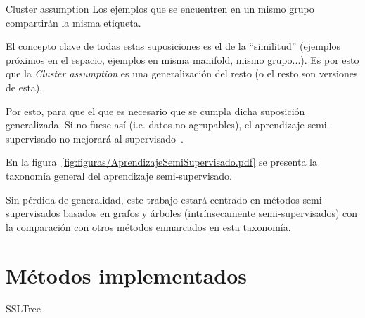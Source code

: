 \medskip

\begin{mainbox}{Cluster assumption}
    Los ejemplos que se encuentren en un mismo grupo compartirán la misma etiqueta.
\end{mainbox}


El concepto clave de todas estas suposiciones es el de la ``similitud'' 
(ejemplos próximos en el espacio, ejemplos en misma manifold, mismo grupo...). 
Es por esto que la \textit{Cluster assumption} es una generalización del
resto (o el resto son versiones de esta).

Por esto, para que el que 
es necesario que se cumpla dicha suposición generalizada. Si no fuese así (i.e. datos no agrupables),
el aprendizaje semi-supervisado no mejorará al supervisado~\cite{vanEngelen2020}.


En la figura~\ref{fig:figuras/AprendizajeSemiSupervisado.pdf} se presenta la taxonomía general del aprendizaje semi-supervisado.


Sin pérdida de generalidad, este trabajo estará centrado en métodos semi-supervisados basados en grafos y árboles (intrínsecamente semi-supervisados) con la comparación con otros métodos enmarcados en esta taxonomía.

\clearpage
\section{Métodos implementados}

SSLTree